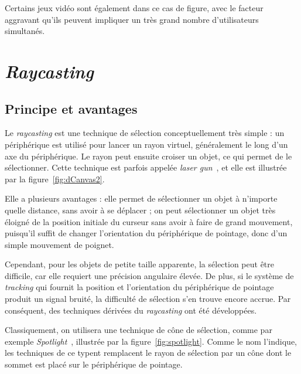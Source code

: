 	Certains jeux vidéo sont également dans ce cas de figure, avec le facteur aggravant qu'ils peuvent impliquer un très grand nombre d'utilisateurs simultanés.
	
\section{\emph{Raycasting}}
	\subsection{Principe et avantages}
	Le \emph{raycasting} est une technique de sélection conceptuellement très simple : un périphérique est utilisé pour lancer un rayon virtuel, généralement le long d'un axe du périphérique. Le rayon peut ensuite croiser un objet, ce qui permet de le sélectionner. Cette technique est parfois appelée \emph{laser gun}~\cite{liang1994jdcad}, et elle est illustrée par la figure~\ref{fig:dCanvas2}.
	
	Elle a plusieurs avantages : elle permet de sélectionner un objet à n'importe quelle distance, sans avoir à se déplacer ; on peut sélectionner un objet très éloigné de la position initiale du curseur sans avoir à faire de grand mouvement, puisqu'il suffit de changer l'orientation du périphérique de pointage, donc d'un simple mouvement de poignet.
	
	Cependant, pour les objets de petite taille apparente, la sélection peut être difficile, car elle requiert une précision angulaire élevée. De plus, si le système de \emph{tracking} qui fournit la position et l'orientation du périphérique de pointage produit un signal bruité, la difficulté de sélection s'en trouve encore accrue. Par conséquent, des techniques dérivées du \emph{raycasting} ont été développées.
	
	Classiquement, on utilisera une technique de cône de sélection, comme par exemple \emph{Spotlight}~\cite{liang1994jdcad}, illustrée par la figure~\ref{fig:spotlight}. Comme le nom l'indique, les techniques de ce typent remplacent le rayon de sélection par un cône dont le sommet est placé sur le périphérique de pointage.
	
